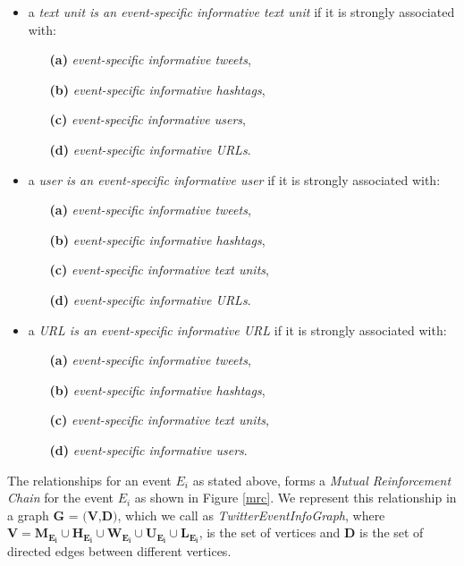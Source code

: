\begin{itemize} 
\item a \textit{text unit is an event-specific informative text unit} if it is strongly associated with:
\begin{itemize}
\item[\textbf{(a)}] \textit{event-specific informative tweets}, 
\item[\textbf{(b)}] \textit{event-specific informative hashtags}, 
\item[\textbf{(c)}] \textit{event-specific informative users}, 
\item[\textbf{(d)}] \textit{event-specific informative URLs}. 
\end{itemize}
\end{itemize}

\begin{itemize} 
\item a \textit{user is an event-specific informative user} if it is strongly associated with:
\begin{itemize}
\item[\textbf{(a)}] \textit{event-specific informative tweets}, 
\item[\textbf{(b)}] \textit{event-specific informative hashtags}, 
\item[\textbf{(c)}] \textit{event-specific informative text units},
\item[\textbf{(d)}] \textit{event-specific informative URLs}. 
\end{itemize}
\end{itemize}

\begin{itemize} \item a \textit{URL is an event-specific informative URL} if it is strongly associated with:
\begin{itemize}
\item[\textbf{(a)}] \textit{event-specific informative tweets}, 
\item[\textbf{(b)}] \textit{event-specific informative hashtags}, 
\item[\textbf{(c)}] \textit{event-specific informative text units},
\item[\textbf{(d)}] \textit{event-specific informative users}. 
\end{itemize}
\end{itemize}


The relationships for an event $\scriptstyle E_{i}$ as stated above, forms a \textit{Mutual Reinforcement Chain} \cite{wei2008query} for the event $E_{i}$ as shown in Figure \ref{mrc}. We represent this relationship in a graph $\textbf{G = (V,D)}$, which we call as \textit{TwitterEventInfoGraph}, where $\mathbf{V = M_{E_{i}} \cup H_{E_{i}} \cup W_{E_{i}} \cup U_{E_{i}} \cup L_{E_{i}}}$, is the set of vertices and $\mathbf{D}$ is the set of directed edges between different vertices. 

